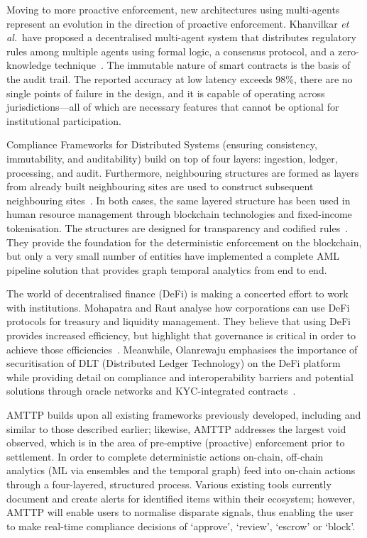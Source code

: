 \documentclass[journal]{IEEEtran}
\newcommand{\etal}{\textit{et al.}}
\begin{document}
Moving to more proactive enforcement, new architectures using multi-agents represent an evolution in the direction of proactive enforcement. Khanvilkar \etal\ have proposed a decentralised multi-agent system that distributes regulatory rules among multiple agents using formal logic, a consensus protocol, and a zero-knowledge technique~\cite{khanvilkar2025}. The immutable nature of smart contracts is the basis of the audit trail. The reported accuracy at low latency exceeds 98\%, there are no single points of failure in the design, and it is capable of operating across jurisdictions---all of which are necessary features that cannot be optional for institutional participation.

Compliance Frameworks for Distributed Systems (ensuring consistency, immutability, and auditability) build on top of four layers: ingestion, ledger, processing, and audit. Furthermore, neighbouring structures are formed as layers from already built neighbouring sites are used to construct subsequent neighbouring sites~\cite{gade2025}. In both cases, the same layered structure has been used in human resource management through blockchain technologies and fixed-income tokenisation. The structures are designed for transparency and codified rules~\cite{madanchian2026}. They provide the foundation for the deterministic enforcement on the blockchain, but only a very small number of entities have implemented a complete AML pipeline solution that provides graph temporal analytics from end to end.

The world of decentralised finance (DeFi) is making a concerted effort to work with institutions. Mohapatra and Raut analyse how corporations can use DeFi protocols for treasury and liquidity management. They believe that using DeFi provides increased efficiency, but highlight that governance is critical in order to achieve those efficiencies~\cite{mohapatra2025}. Meanwhile, Olanrewaju emphasises the importance of securitisation of DLT (Distributed Ledger Technology) on the DeFi platform while providing detail on compliance and interoperability barriers and potential solutions through oracle networks and KYC-integrated contracts~\cite{olanrewaju2025}.

AMTTP builds upon all existing frameworks previously developed, including and similar to those described earlier; likewise, AMTTP addresses the largest void observed, which is in the area of pre-emptive (proactive) enforcement prior to settlement. In order to complete deterministic actions on-chain, off-chain analytics (ML via ensembles and the temporal graph) feed into on-chain actions through a four-layered, structured process. Various existing tools currently document and create alerts for identified items within their ecosystem; however, AMTTP will enable users to normalise disparate signals, thus enabling the user to make real-time compliance decisions of `approve', `review', `escrow' or `block'.
\end{document}
